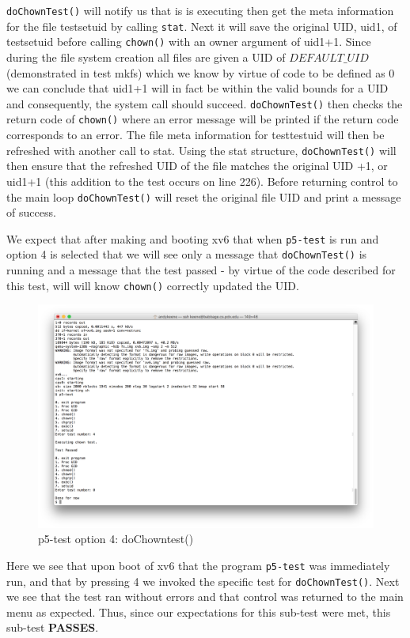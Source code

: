 \documentclass[11pt,letterpaper]{report}
\begin{document}
	 {\tt doChownTest()} will notify us that is is executing then get the meta information for the file testsetuid by calling {\tt stat}. Next it will save the original UID, uid1, of
	 testsetuid before calling {\tt chown()} with an owner argument of uid1+1. Since during the file system creation all files are given a UID of $DEFAULT\_UID$ 
	 (demonstrated in test mkfs) which we 
	 know by virtue of code to be defined as 0 we can conclude that uid1+1 will in fact be within the valid bounds for a UID and consequently, the system call should succeed.
	 {\tt doChownTest()} then checks the return code of {\tt chown()} where an error message will be printed if the return code corresponds to an error. The file meta information
	 for testtestuid will then be refreshed with another call to stat. Using the stat structure, {\tt doChownTest()} will then ensure that the refreshed UID of the file matches the original
	 UID +1, or uid1+1 (this addition to the test occurs on line 226). Before returning control to the main loop {\tt doChownTest()} will reset the original file UID and print a message of success.
	 
	 We expect that after making and booting xv6 that when {\tt p5-test} is run and option 4 is selected that we will see only a message that {\tt doChownTest()} is running and 
	 a message that the test passed - by virtue of the code described for this test, will will know {\tt chown()} correctly updated the UID.
	 
\begin{figure}[h!]
\centering
\includegraphics[width=0.8\linewidth]{dochowntest.png}
\caption{p5-test option 4: doChowntest()}
\label{fig:datetest}
\end{figure}

\pagebreak
Here we see that upon boot of xv6 that the program {\tt p5-test} was immediately run, and that by pressing 4 we invoked the specific test for {\tt doChownTest()}. Next we see that the test ran without
errors and that control was returned to the main menu as expected. Thus, since our expectations for this sub-test were met, this sub-test \textbf{PASSES}.
		
\end{document}
